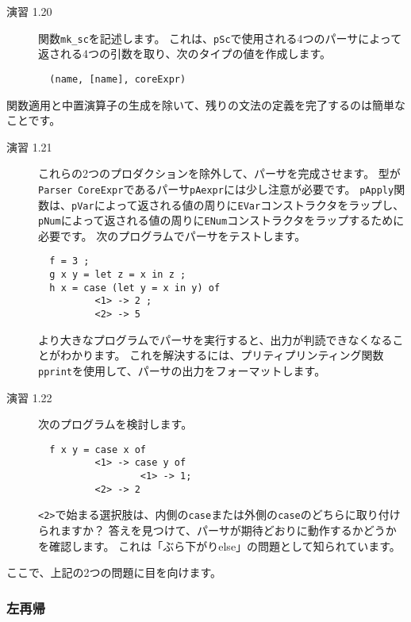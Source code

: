 \documentclass{jarticle}
\begin{document}
\begin{description}
	\item[演習 1.20] 関数\texttt{mk\_sc}を記述します。
	      これは、\texttt{pSc}で使用される4つのパーサによって返される4つの引数を取り、次のタイプの値を作成します。
	      \begin{verbatim}
  (name, [name], coreExpr)
\end{verbatim}
\end{description}

関数適用と中置演算子の生成を除いて、残りの文法の定義を完了するのは簡単なことです。

\begin{description}
	\item[演習 1.21] これらの2つのプロダクションを除外して、パーサを完成させます。
	      型が\texttt{Parser CoreExpr}であるパーサ\texttt{pAexpr}には少し注意が必要です。
	      \texttt{pApply}関数は、\texttt{pVar}によって返される値の周りに\texttt{EVar}コンストラクタをラップし、
	      \texttt{pNum}によって返される値の周りに\texttt{ENum}コンストラクタをラップするために必要です。
	      次のプログラムでパーサをテストします。

	      \begin{verbatim}
  f = 3 ;
  g x y = let z = x in z ;
  h x = case (let y = x in y) of
          <1> -> 2 ;
          <2> -> 5
\end{verbatim}

	      より大きなプログラムでパーサを実行すると、出力が判読できなくなることがわかります。
	      これを解決するには、プリティプリンティング関数\texttt{pprint}を使用して、パーサの出力をフォーマットします。
	\item[演習 1.22] 次のプログラムを検討します。

	      \begin{verbatim}
  f x y = case x of
          <1> -> case y of
                  <1> -> 1;
          <2> -> 2
\end{verbatim}

	      \texttt{<2>}で始まる選択肢は、内側の\texttt{case}または外側の\texttt{case}のどちらに取り付けられますか？
	      答えを見つけて、パーサが期待どおりに動作するかどうかを確認します。
	      これは「ぶら下がりelse」の問題として知られています。
\end{description}

ここで、上記の2つの問題に目を向けます。

\subsubsection{左再帰}
\end{document}
